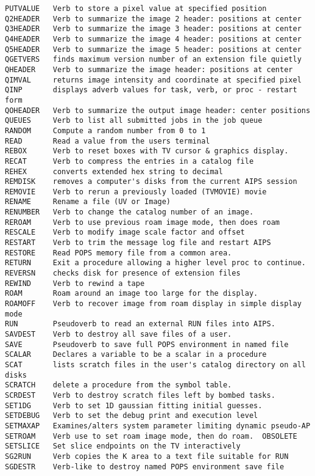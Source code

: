 \begin{verbatim}
PUTVALUE   Verb to store a pixel value at specified position
Q2HEADER   Verb to summarize the image 2 header: positions at center
Q3HEADER   Verb to summarize the image 3 header: positions at center
Q4HEADER   Verb to summarize the image 4 header: positions at center
Q5HEADER   Verb to summarize the image 5 header: positions at center
QGETVERS   finds maximum version number of an extension file quietly
QHEADER    Verb to summarize the image header: positions at center
QIMVAL     returns image intensity and coordinate at specified pixel
QINP       displays adverb values for task, verb, or proc - restart form
QOHEADER   Verb to summarize the output image header: center positions
QUEUES     Verb to list all submitted jobs in the job queue
RANDOM     Compute a random number from 0 to 1
READ       Read a value from the users terminal
REBOX      Verb to reset boxes with TV cursor & graphics display.
RECAT      Verb to compress the entries in a catalog file
REHEX      converts extended hex string to decimal
REMDISK    removes a computer's disks from the current AIPS session
REMOVIE    Verb to rerun a previously loaded (TVMOVIE) movie
RENAME     Rename a file (UV or Image)
RENUMBER   Verb to change the catalog number of an image.
REROAM     Verb to use previous roam image mode, then does roam
RESCALE    Verb to modify image scale factor and offset
RESTART    Verb to trim the message log file and restart AIPS
RESTORE    Read POPS memory file from a common area.
RETURN     Exit a procedure allowing a higher level proc to continue.
REVERSN    checks disk for presence of extension files
REWIND     Verb to rewind a tape
ROAM       Roam around an image too large for the display.
ROAMOFF    Verb to recover image from roam display in simple display mode
RUN        Pseudoverb to read an external RUN files into AIPS.
SAVDEST    Verb to destroy all save files of a user.
SAVE       Pseudoverb to save full POPS environment in named file
SCALAR     Declares a variable to be a scalar in a procedure
SCAT       lists scratch files in the user's catalog directory on all disks
SCRATCH    delete a procedure from the symbol table.
SCRDEST    Verb to destroy scratch files left by bombed tasks.
SET1DG     Verb to set 1D gaussian fitting initial guesses.
SETDEBUG   Verb to set the debug print and execution level
SETMAXAP   Examines/alters system parameter limiting dynamic pseudo-AP
SETROAM    Verb use to set roam image mode, then do roam.  OBSOLETE
SETSLICE   Set slice endpoints on the TV interactively
SG2RUN     Verb copies the K area to a text file suitable for RUN
SGDESTR    Verb-like to destroy named POPS environment save file

\end{verbatim}
